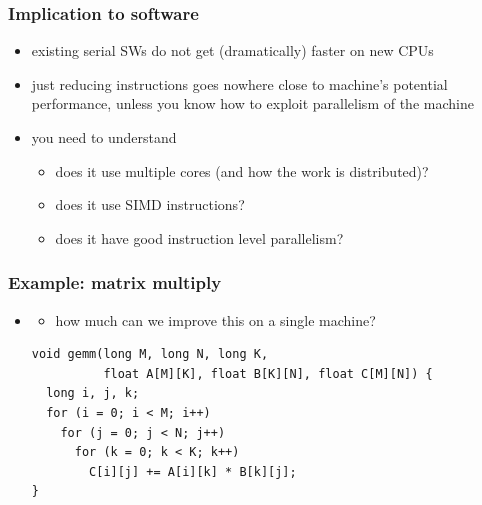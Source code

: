 \documentclass[12pt,dvipdfmx]{beamer}
\newcommand{\ao}[1]{{\color{blue}#1}}
\begin{document}
\begin{frame}
\frametitle{Implication to software}
\begin{itemize}
\item<1-> existing serial SWs do not get (dramatically) faster on new CPUs
\item<2-> just reducing instructions goes nowhere close to machine's potential performance,
  unless you know how to exploit parallelism of the machine
\item<3-> you need to understand
  \begin{itemize}
  \item does it use multiple cores (and how the work is distributed)?
  \item does it use SIMD instructions?
  \item does it have good instruction level parallelism?
  \end{itemize}
\end{itemize}
\end{frame}

\begin{frame}[fragile]
\frametitle{Example: matrix multiply}

\begin{itemize}
\item []
  \begin{itemize}
  \item how much can we improve this on a single machine?
  \end{itemize}

\begin{lstlisting}
void gemm(long M, long N, long K,
          float A[M][K], float B[K][N], float C[M][N]) {
  long i, j, k;
  for (i = 0; i < M; i++)
    for (j = 0; j < N; j++)
      for (k = 0; k < K; k++)
        C[i][j] += A[i][k] * B[k][j];
}
\end{lstlisting}

\end{itemize}

\end{frame}
\end{document}
